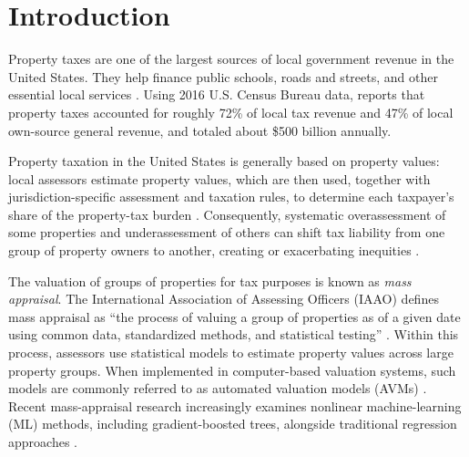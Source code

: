 \documentclass[10pt]{article}
\theoremstyle{definition}
\newcommand{\1}{\mathbf{1}}
\begin{document}
\section{Introduction}
\label{sec:introduction}

Property taxes are one of the largest sources of local government revenue in the United States. They help finance public schools, roads and streets, and other essential local services \cite{IAAO2020PropertyTaxPolicy}. Using 2016 U.S. Census Bureau data, \textcite{Berry2021} reports that property taxes accounted for roughly 72\% of local tax revenue and 47\% of local own-source general revenue, and totaled about \$500 billion annually.

{Property taxation in the United States is generally based on property values}: local assessors estimate property values, which are then used, together with jurisdiction-specific assessment and taxation rules, to determine each taxpayer's share of the property-tax burden \cite{IAAO2020PropertyTaxPolicy,IAAO2025Mass}. Consequently, systematic overassessment of some properties and underassessment of others can shift tax liability from one group of property owners to another, creating or exacerbating inequities \cite{Berry2021,IAAO2020PropertyTaxPolicy}.

The {valuation} of groups of properties for tax purposes is known as \emph{mass appraisal}. The International Association of Assessing Officers (IAAO) defines mass appraisal as ``the process of valuing a group of properties as of a given date using common data, standardized methods, and statistical testing'' \cite{IAAO2025Mass}. Within this process, assessors use statistical models to estimate property values across large property groups. {When implemented in computer-based valuation systems, such models are commonly referred to as automated valuation models (AVMs)} \cite{IAAOAITaskForce2022,BidansetRakow2022}. Recent mass-appraisal research increasingly examines nonlinear machine-learning (ML) methods, including gradient-boosted trees, alongside traditional regression approaches \cite{Rootetal2023,Sevgen2024100111,Zilli2024}. %
\end{document}
